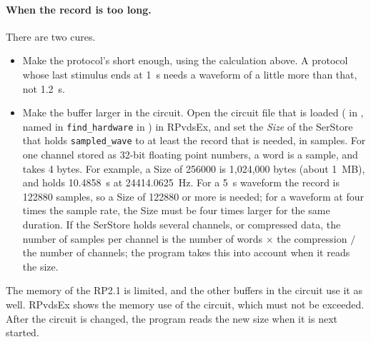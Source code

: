 \paragraph{When the record is too long.} There are two cures.
\begin{itemize}
\item Make the protocol's  short enough, using the calculation
  above. A protocol whose last stimulus ends at 1~s needs a waveform of a little more
  than that, not 1.2~s.
\item Make the buffer larger in the circuit. Open the circuit file that is loaded
  ( in , named in \texttt{find\_hardware} in
  ) in RPvdsEx, and set the \emph{Size} of the SerStore that holds
  \texttt{sampled\_wave} to at least the record that is needed, in samples. For one
  channel stored as 32-bit floating point numbers, a word is a sample, and takes 4
  bytes. For example, a Size of 256000 is 1,024,000 bytes (about 1~MB), and holds
  10.4858~s at 24414.0625~Hz. For a 5~s waveform the record is 122880 samples, so a Size
  of 122880 or more is needed; for a waveform at four times the sample rate, the Size
  must be four times larger for the same duration. If the SerStore holds several
  channels, or compressed data, the number of samples per channel is the number of
  words $\times$ the compression $/$ the number of channels; the program takes this into
  account when it reads the size.
\end{itemize}
The memory of the RP2.1 is limited, and the other buffers in the circuit use it as well.
RPvdsEx shows the memory use of the circuit, which must not be exceeded. After the
circuit is changed, the program reads the new size when it is next started.
